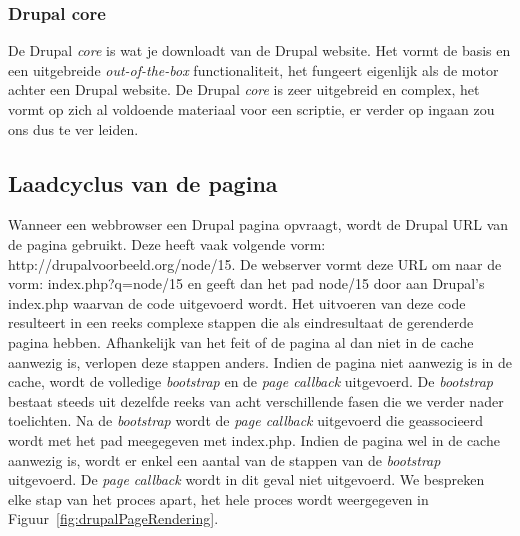 \subsubsection{Drupal core}
De Drupal \textit{core} is wat je downloadt van de Drupal website. Het vormt de basis en een uitgebreide \textit{out-of-the-box} functionaliteit, het fungeert eigenlijk als de motor achter een Drupal website. De Drupal \textit{core} is zeer uitgebreid en complex, het vormt op zich al voldoende materiaal voor een scriptie, er verder op ingaan zou ons dus te ver leiden.

\newpage
\subsection{Laadcyclus van de pagina}
Wanneer een webbrowser een Drupal pagina opvraagt, wordt de Drupal URL van de pagina gebruikt. Deze heeft vaak volgende vorm: http://drupalvoorbeeld.org/node/15. De webserver vormt deze URL om naar de vorm: index.php?q=node/15 en geeft dan het pad node/15 door aan Drupal's index.php waarvan de code uitgevoerd wordt. Het uitvoeren van deze code resulteert in een reeks complexe stappen die als eindresultaat de gerenderde pagina hebben. Afhankelijk van het feit of de pagina al dan niet in de cache aanwezig is, verlopen deze stappen anders. Indien de pagina niet aanwezig is in de cache, wordt de volledige \textit{bootstrap} en de \textit{page callback} uitgevoerd. De \textit{bootstrap} bestaat steeds uit dezelfde reeks van acht verschillende fasen die we verder nader toelichten. Na de \textit{bootstrap} wordt de \textit{page callback} uitgevoerd die geassocieerd wordt met het pad meegegeven met index.php. Indien de pagina wel in de cache aanwezig is, wordt er enkel een aantal van de stappen van de \textit{bootstrap} uitgevoerd. De \textit{page callback} wordt in dit geval niet uitgevoerd. We bespreken elke stap van het proces apart, het hele proces wordt weergegeven in Figuur~\ref{fig:drupalPageRendering}.


